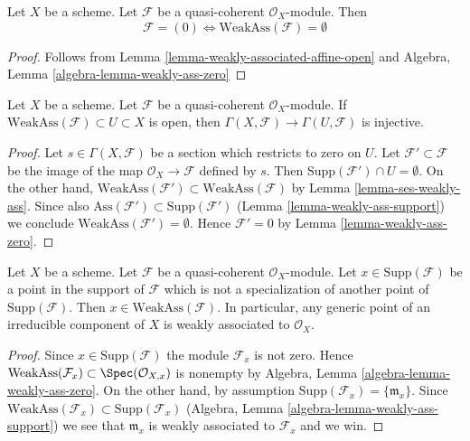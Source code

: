 \begin{lemma}
\label{lemma-weakly-ass-zero}
Let $X$ be a scheme.
Let $\mathcal{F}$ be a quasi-coherent $\mathcal{O}_X$-module.
Then
$$
\mathcal{F} = (0) \Leftrightarrow \text{WeakAss}(\mathcal{F}) = \emptyset
$$
\end{lemma}

\begin{proof}
Follows from
Lemma \ref{lemma-weakly-associated-affine-open}
and
Algebra, Lemma \ref{algebra-lemma-weakly-ass-zero}
\end{proof}

\begin{lemma}
\label{lemma-restriction-injective-open-contains-weakly-ass}
Let $X$ be a scheme. Let $\mathcal{F}$ be a quasi-coherent
$\mathcal{O}_X$-module. If $\text{WeakAss}(\mathcal{F}) \subset U \subset X$
is open, then $\Gamma(X, \mathcal{F}) \to \Gamma(U, \mathcal{F})$
is injective.
\end{lemma}

\begin{proof}
Let $s \in \Gamma(X, \mathcal{F})$ be a section which restricts to zero on $U$.
Let $\mathcal{F}' \subset \mathcal{F}$ be the image of the map
$\mathcal{O}_X \to \mathcal{F}$ defined by $s$. Then
$\text{Supp}(\mathcal{F}') \cap U = \emptyset$. On the other hand,
$\text{WeakAss}(\mathcal{F}') \subset \text{WeakAss}(\mathcal{F})$
by Lemma \ref{lemma-ses-weakly-ass}. Since also
$\text{Ass}(\mathcal{F}') \subset \text{Supp}(\mathcal{F}')$
(Lemma \ref{lemma-weakly-ass-support}) we conclude
$\text{WeakAss}(\mathcal{F}') = \emptyset$.
Hence $\mathcal{F}' = 0$ by Lemma \ref{lemma-weakly-ass-zero}.
\end{proof}

\begin{lemma}
\label{lemma-minimal-support-in-weakly-ass}
Let $X$ be a scheme.
Let $\mathcal{F}$ be a quasi-coherent $\mathcal{O}_X$-module.
Let $x \in \text{Supp}(\mathcal{F})$ be a point in the support
of $\mathcal{F}$ which is not a specialization of another point of
$\text{Supp}(\mathcal{F})$. Then
$x \in \text{WeakAss}(\mathcal{F})$.
In particular, any generic point of an irreducible component of $X$
is weakly associated to $\mathcal{O}_X$.
\end{lemma}

\begin{proof}
Since $x \in \text{Supp}(\mathcal{F})$ the module $\mathcal{F}_x$
is not zero. Hence
$\text{WeakAss}(\mathcal{F}_x) \subset \Spec(\mathcal{O}_{X, x})$
is nonempty by
Algebra, Lemma \ref{algebra-lemma-weakly-ass-zero}.
On the other hand, by assumption
$\text{Supp}(\mathcal{F}_x) = \{\mathfrak m_x\}$.
Since
$\text{WeakAss}(\mathcal{F}_x) \subset \text{Supp}(\mathcal{F}_x)$
(Algebra, Lemma \ref{algebra-lemma-weakly-ass-support})
we see that $\mathfrak m_x$ is weakly associated to $\mathcal{F}_x$
and we win.
\end{proof}

